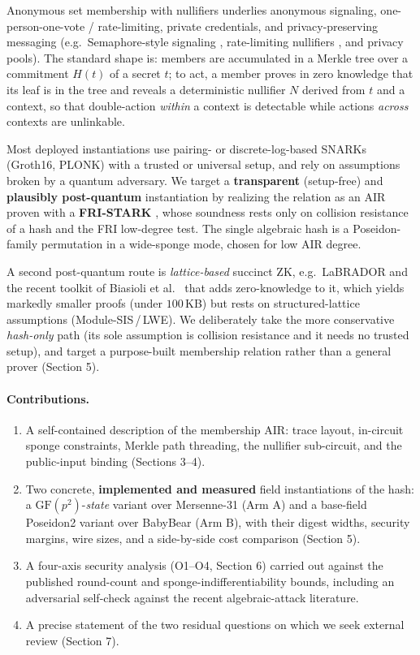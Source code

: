 \documentclass[11pt]{article}
\newcommand{\GF}[1]{\mathrm{GF}(#1)}
\theoremstyle{plain}
\theoremstyle{definition}
\begin{document}
Anonymous set membership with nullifiers underlies anonymous signaling, one-person-one-vote /
rate-limiting, private credentials, and privacy-preserving messaging (e.g.\ Semaphore-style signaling
\cite{Sem}, rate-limiting nullifiers \cite{RLN}, and privacy pools). The standard shape is: members
are accumulated in a Merkle tree over a commitment $H(t)$ of a secret $t$; to act, a member proves in
zero knowledge that its leaf is in the tree and reveals a deterministic nullifier $N$ derived from
$t$ and a context, so that double-action \emph{within} a context is detectable while actions
\emph{across} contexts are unlinkable.

Most deployed instantiations use pairing- or discrete-log-based SNARKs (Groth16, PLONK) with a
trusted or universal setup, and rely on assumptions broken by a quantum adversary. We target a
\textbf{transparent} (setup-free) and \textbf{plausibly post-quantum} instantiation by realizing the
relation as an AIR proven with a \textbf{FRI-STARK} \cite{BBHR18,BGKS20}, whose soundness rests only
on collision resistance of a hash and the FRI low-degree test. The single algebraic hash is a
Poseidon-family permutation \cite{GKRRS21,GKS23} in a wide-sponge mode, chosen for low AIR degree.

A second post-quantum route is \emph{lattice-based} succinct ZK, e.g.\ LaBRADOR \cite{LaBRADOR} and
the recent toolkit of Biasioli et al.\ \cite{BBL26} that adds zero-knowledge to it, which yields
markedly smaller proofs (under $100$\,KB) but rests on structured-lattice assumptions
(Module-SIS\,/\,LWE). We deliberately take the more conservative \emph{hash-only} path (its sole
assumption is collision resistance and it needs no trusted setup), and target a purpose-built
membership relation rather than a general prover (Section 5).

\paragraph{Contributions.}
\begin{enumerate}[leftmargin=*]
\item A self-contained description of the membership AIR: trace layout, in-circuit sponge constraints,
  Merkle path threading, the nullifier sub-circuit, and the public-input binding (Sections 3--4).
\item Two concrete, \textbf{implemented and measured} field instantiations of the hash: a
  $\GF{p^2}$-\emph{state} variant over Mersenne-31 (Arm A) and a base-field Poseidon2 variant over
  BabyBear (Arm B), with their digest widths, security margins, wire sizes, and a side-by-side cost
  comparison (Section 5).
\item A four-axis security analysis (O1--O4, Section 6) carried out against the published round-count
  and sponge-indifferentiability bounds, including an adversarial self-check against the recent
  algebraic-attack literature.
\item A precise statement of the two residual questions on which we seek external review (Section 7).
\end{enumerate}
\end{document}
